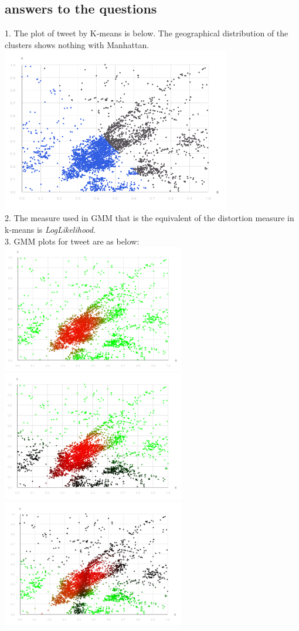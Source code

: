 \documentclass[11pt]{article} %
\begin{document}
\subsection{answers to the questions}

1.  The plot of tweet by K-means is below. The geographical distribution of the clusters shows nothing with Manhattan.
\\
\includegraphics[width=10cm]{kmean-tweet}\\
2. The measure used in GMM that is the equivalent of the distortion measure in k-means is \emph{LogLikelihood}.\\
3. GMM plots for tweet are as below:\\
\includegraphics[width=8cm]{gauss-tweet2}\\
\includegraphics[width=8cm]{gauss-tweet3}\\
\includegraphics[width=8cm]{gauss-tweet4}\\
\end{document}
